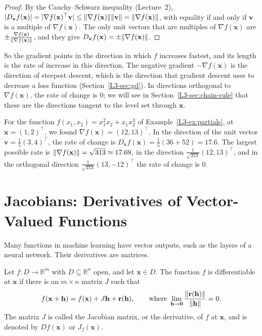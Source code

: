 \begin{proof}
    By the Cauchy--Schwarz inequality (Lecture~2), $|D_{\mathbf{v}} f(\mathbf{x})| = |\nabla f(\mathbf{x})^\top \mathbf{v}| \leq \lVert \nabla f(\mathbf{x}) \rVert \lVert \mathbf{v} \rVert = \lVert \nabla f(\mathbf{x}) \rVert$, with equality if and only if $\mathbf{v}$ is a multiple of $\nabla f(\mathbf{x})$. The only unit vectors that are multiples of $\nabla f(\mathbf{x})$ are $\pm \frac{\nabla f(\mathbf{x})}{\lVert \nabla f(\mathbf{x}) \rVert}$, and they give $D_{\mathbf{v}} f(\mathbf{x}) = \pm \lVert \nabla f(\mathbf{x}) \rVert$.
\end{proof}

So the gradient points in the direction in which $f$ increases fastest, and its length is the rate of increase in this direction. The negative gradient $-\nabla f(\mathbf{x})$ is the direction of steepest descent, which is the direction that gradient descent uses to decrease a loss function (Section~\ref{L3-sec:gd}). In directions orthogonal to $\nabla f(\mathbf{x})$, the rate of change is $0$; we will see in Section~\ref{L3-sec:chain-rule} that these are the directions tangent to the level set through $\mathbf{x}$.

\begin{example}\label{L3-ex:directional}
    For the function $f(x_1, x_2) = x_1^2 x_2 + x_1 x_2^3$ of Example~\ref{L3-ex:partials}, at $\mathbf{x} = (1, 2)^\top$, we found $\nabla f(\mathbf{x}) = (12, 13)^\top$. In the direction of the unit vector $\mathbf{v} = \frac{1}{5}(3, 4)^\top$, the rate of change is $D_{\mathbf{v}} f(\mathbf{x}) = \frac{1}{5}(36 + 52) = 17.6$. The largest possible rate is $\lVert \nabla f(\mathbf{x}) \rVert = \sqrt{313} \approx 17.69$, in the direction $\frac{1}{\sqrt{313}}(12, 13)^\top$, and in the orthogonal direction $\frac{1}{\sqrt{313}}(13, -12)^\top$ the rate of change is $0$.
\end{example}

\section{Jacobians: Derivatives of Vector-Valued Functions}\label{L3-sec:jacobians}

Many functions in machine learning have vector outputs, such as the layers of a neural network. Their derivatives are matrices.

\begin{definition}[Jacobian]\label{L3-def:jacobian}
    Let $f: D \to \mathbb{R}^m$ with $D \subseteq \mathbb{R}^n$ open, and let $\mathbf{x} \in D$. The function $f$ is differentiable at $\mathbf{x}$ if there is an $m \times n$ matrix $J$ such that
    \[f(\mathbf{x} + \mathbf{h}) = f(\mathbf{x}) + J\mathbf{h} + \mathbf{r}(\mathbf{h}), \qquad \text{where } \lim_{\mathbf{h} \to \mathbf{0}} \frac{\lVert \mathbf{r}(\mathbf{h}) \rVert}{\lVert \mathbf{h} \rVert} = 0.\]
    The matrix $J$ is called the Jacobian matrix, or the derivative, of $f$ at $\mathbf{x}$, and is denoted by $Df(\mathbf{x})$ or $J_f(\mathbf{x})$.
\end{definition}

